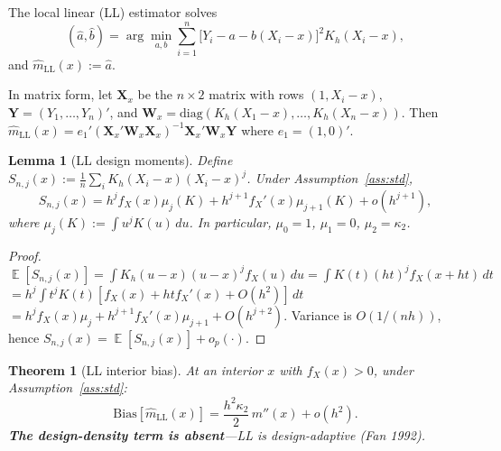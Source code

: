 \documentclass[11pt]{article}
\theoremstyle{plain}
\newtheorem{lemma}{Lemma}
\newtheorem{theorem}{Theorem}
\theoremstyle{definition}
\theoremstyle{remark}
\DeclareMathOperator{\E}{\mathbb{E}}
\begin{document}
The local linear (LL) estimator solves
\[
  (\hat a, \hat b) = \arg\min_{a,b} \sum_{i=1}^n \bigl[Y_i - a - b(X_i - x)\bigr]^2 K_h(X_i - x),
\]
and $\hat m_{\text{LL}}(x) := \hat a$.

In matrix form, let $\mathbf{X}_x$ be the $n \times 2$ matrix with rows $(1, X_i - x)$,
$\mathbf{Y} = (Y_1, \ldots, Y_n)'$, and $\mathbf{W}_x = \text{diag}(K_h(X_1-x), \ldots, K_h(X_n-x))$.
Then $\hat m_{\text{LL}}(x) = e_1' (\mathbf{X}_x' \mathbf{W}_x \mathbf{X}_x)^{-1} \mathbf{X}_x' \mathbf{W}_x \mathbf{Y}$
where $e_1 = (1, 0)'$.

\begin{lemma}[LL design moments]\label{lem:lldesign}
Define $S_{n,j}(x) := \tfrac{1}{n}\sum_i K_h(X_i - x)(X_i - x)^j$. Under
Assumption~\ref{ass:std},
\[
S_{n,j}(x) = h^j f_X(x) \mu_j(K) + h^{j+1} f_X'(x) \mu_{j+1}(K) + o(h^{j+1}),
\]
where $\mu_j(K) := \int u^j K(u)\,du$. In particular,
$\mu_0 = 1$, $\mu_1 = 0$, $\mu_2 = \kappa_2$.
\end{lemma}

\begin{proof}
$\E[S_{n,j}(x)] = \int K_h(u - x)(u-x)^j f_X(u)\,du = \int K(t)(ht)^j f_X(x+ht)\,dt$
$= h^j \int t^j K(t) [f_X(x) + h t f_X'(x) + O(h^2)]\,dt$
$= h^j f_X(x)\mu_j + h^{j+1} f_X'(x) \mu_{j+1} + O(h^{j+2})$.
Variance is $O(1/(nh))$, hence $S_{n,j}(x) = \E[S_{n,j}(x)] + o_p(\cdot)$.
\end{proof}

\begin{theorem}[LL interior bias]\label{thm:llbias}
At an interior $x$ with $f_X(x) > 0$, under Assumption~\ref{ass:std}:
\[
\boxed{\;
\text{Bias}[\hat m_{\text{LL}}(x)] = \frac{h^2 \kappa_2}{2}\, m''(x) + o(h^2).\;}
\]
\textbf{The design-density term is absent}—LL is design-adaptive (Fan 1992).
\end{theorem}
\end{document}
